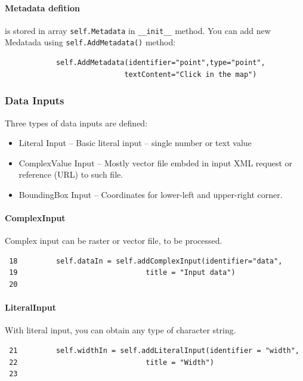 \documentclass[a4paper,11pt]{article}
\begin{document}
\paragraph{Metadata defition} is stored in array \texttt{self.Metadata} in
\texttt{\_\_init\_\_} method. You can add new Medatada using
\texttt{self.AddMetadata()} method:
\begin{verbatim}
            self.AddMetadata(identifier="point",type="point",
                            textContent="Click in the map")
\end{verbatim}

\subsubsection{Data Inputs}

Three types of data inputs are defined:
\begin{itemize}
    \item Literal Input -- Basic literal input -- single number or text
    value
    \item ComplexValue Input  -- Mostly vector file embded in input XML
    request or reference (URL) to such file.
    \item BoundingBox Input -- Coordinates for lower-left and upper-right
    corner.
\end{itemize}


\paragraph{ComplexInput}
Complex input can be raster or vector file, to be processed. 

\begin{verbatim}
 18         self.dataIn = self.addComplexInput(identifier="data",
 19                              title = "Input data")
 20 
\end{verbatim}

\paragraph{LiteralInput}

With literal input, you can obtain any type of character string.

\begin{verbatim}
 21         self.widthIn = self.addLiteralInput(identifier = "width",
 22                              title = "Width")
 23 
\end{verbatim}
\end{document}

